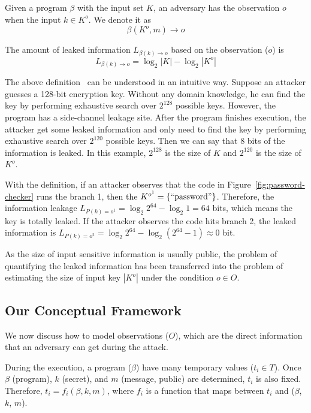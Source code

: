 \begin{mydef}
    \label{def}
    Given a program $\beta$ with the input set $K$,
    an adversary has the observation $o$ when the input $k{\in}K^o$.
    We denote it as
    $$\beta(K^o, m) \rightarrow	o$$

    The amount of leaked information $L_{\beta(k)\rightarrow o}$ based on the observation ($o$) is
    $$L_{\beta(k)\rightarrow o} = \log_2{|K|} - \log_2{|K^o|}$$
\end{mydef}

The above definition~\cite{AskarovC12} can be understood in an intuitive way. Suppose an attacker
guesses a 128-bit encryption key. 
Without any domain knowledge, 
he can find the key by performing exhaustive search over $2^{128}$ possible keys. 
However, the program has a side-channel leakage site. After the program finishes execution, the
attacker get some leaked information and only need to find the key by performing 
exhaustive search over $2^{120}$ possible keys. Then we can say that 8 bits of the information
is leaked. In this example, $2^{128}$ is the size of $K$ and $2^{120}$ is the size of $K^o$.

With the definition, if an attacker observes that the code in
Figure~\ref{fig:password-checker} runs the branch 1, then the $K^{o^{1}} =
\{\mathrm{``password"}\}$. Therefore, the information leakage $L_{P(k)=o^{1}} =
\log_2{2^{64}} - \log_2{1} = 64$ bits, which means the key is totally leaked. If
the attacker observes the code hits branch 2, the leaked information is
$L_{P(k)=o^{2}} = \log_2{2^{64}} - \log_2{(2^{64}-1)} \approx 0$ bit.

As the size of input sensitive information is
usually public, the problem of quantifying the leaked information has been
transferred into the problem of estimating the size of input key $|K^o|$ under
the condition $o \in O$. 

\subsection{Our Conceptual Framework}
\label{side-channel:condition}
We now discuss how to model observations ($O$), which are the direct information
that an adversary can get during the attack.

During the execution, a program ($\beta$) have many temporary values ($t_i \in
T$). Once $\beta$ (program), $k$ (secret), and $m$ (message, public) are
determined, $t_i$ is also fixed. Therefore, $ t_i = f_i(\beta, k, m)$, where $f_
i$ is a function that maps between $t_i$ and ($\beta$, $k$, $m$).

